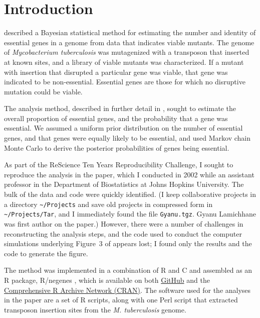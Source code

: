 \setlength{\parskip}{0.5\baselineskip}

\begin{quote}
\small
\articleABSTRACT
\end{quote}


\section{Introduction}

\citet{lamichhane2003} described a Bayesian statistical method for
estimating the number and identity of essential genes in a genome from
data that indicates viable mutants. The genome of \emph{Mycobacterium
tuberculosis\/} was mutagenized with a transposon that inserted at
known sites, and a library of viable mutants was characterized. If a
mutant with insertion that disrupted a particular gene was viable,
that gene was indicated to be non-essential. Essential genes are those
for which no disruptive mutation could be viable.

The analysis method, described in further detail in
\citet{blades2002}, sought to estimate the overall proportion of
essential genes, and the probability that a gene was essential. We
assumed a uniform prior distribution on the number of essential genes,
and that genes were equally likely to be essential, and used Markov
chain Monte Carlo to derive the posterior probabilities of genes being
essential.

As part of the ReScience Ten Years Reproducibility Challenge, I sought
to reproduce the analysis in the paper, which I conducted in 2002
while an assistant professor in the Department of Biostatistics at
Johns Hopkins University. The bulk of the data and code were quickly
identified. (I keep collaborative projects in a directory
{\tt {\textasciitilde}/Projects} and save old projects in compressed form in
{\tt {\textasciitilde}/Projects/Tar}, and I immediately found
the file {\tt Gyanu.tgz}. Gyanu Lamichhane was first author on the
paper.) However, there were a number of challenges in reconstructing
the analysis steps, and the code used to conduct the computer
simulations underlying Figure~3 of \citet{lamichhane2003} appears
lost; I found only the results and the code to generate the figure.

The method was implemented in a combination of R \citep{R} and C
\citep{C} and assembled as an R package, R/negenes \citep{negenes},
which is available on both
\href{https://github.com/kbroman/negenes}{GitHub} and the
\href{https://cran.r-project.org/package=negenes}{Comprehensive R
  Archive Network (CRAN)}. The software used for the analyses in the
paper are a set of R scripts, along with one Perl script
\citep{Perl} that extracted transposon insertion sites from the \emph{M.
tuberculosis\/} genome.

